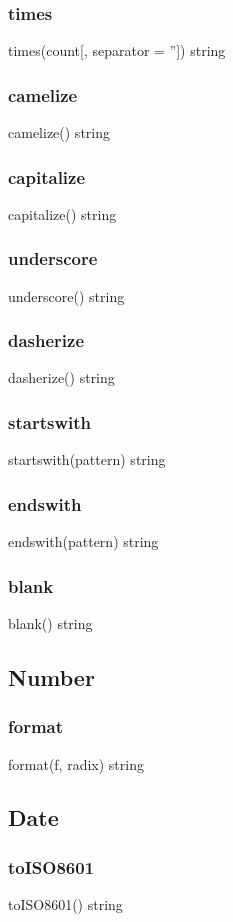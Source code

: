 {{\subsubsection*{times}
times(count[, separator = '']) \rightarrow string
\subsubsection*{camelize}
camelize() \rightarrow string
\subsubsection*{capitalize}
capitalize() \rightarrow string
\subsubsection*{underscore}
underscore() \rightarrow string
\subsubsection*{dasherize}
dasherize() \rightarrow string
\subsubsection*{startswith}
startswith(pattern) \rightarrow string
\subsubsection*{endswith}
endswith(pattern) \rightarrow string
\subsubsection*{blank}
blank() \rightarrow string

\subsection{Number}
\subsubsection*{format}
format(f, radix) \rightarrow string

\subsection{Date}
\subsubsection*{toISO8601}
toISO8601() \rightarrow string

}}
